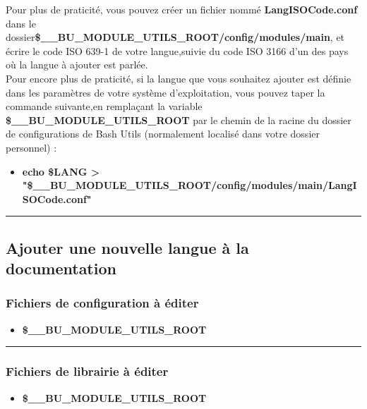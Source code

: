 \documentclass[a4paper,10pt]{article}
\begin{document}
Pour plus de praticité, vous pouvez créer un fichier nommé \textbf{\color{lime}LangISOCode.conf} dans le dossier\linebreak \textbf{\color{orange}\$\_\_BU\_MODULE\_UTILS\_ROOT\color{lime}/config/modules/main}, et écrire le code ISO 639-1 de votre langue,\linebreak suivie du code ISO 3166 d'un des pays où la langue à ajouter est parlée.\\[1\baselineskip]

Pour encore plus de praticité, si la langue que vous souhaitez ajouter est définie dans les paramètres de votre système d'exploitation, vous pouvez taper la commande suivante,en remplaçant la variable \textbf{\color{orange}\$\_\_BU\_MODULE\_UTILS\_ROOT} par le chemin de la racine du dossier de configurations de Bash Utils (normalement localisé dans votre dossier personnel) :
\begin{itemize}
    \item \textbf{\color{gray}echo \color{orange}\$LANG \color{white} > "\color{orange}\$\_\_BU\_MODULE\_UTILS\_ROOT\color{lime}/config/modules/main/LangISOCode.conf\color{white}"}
\end{itemize}





\color{green}\par\noindent\rule{\textwidth}{0.4pt}\color{white}

\color{green}
\subsection{Ajouter une nouvelle langue à la documentation}\color{white}

\color{blue}
\subsubsection{Fichiers de configuration à éditer}\color{white}
\begin{itemize}
    \item \textbf{\color{orange}\$\_\_BU\_MODULE\_UTILS\_ROOT\color{lime}}
\end{itemize}



\color{blue}\par\noindent\rule{\textwidth}{0.4pt}\color{white}

\color{blue}
\subsubsection{Fichiers de librairie à éditer}\color{white}
\begin{itemize}
    \item \textbf{\color{orange}\$\_\_BU\_MODULE\_UTILS\_ROOT\color{lime}}
\end{itemize}
\end{document}
